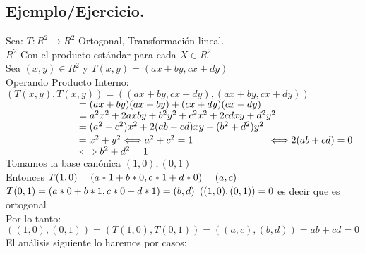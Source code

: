\documentclass{book}
\begin{document}
\subsection{Ejemplo/Ejercicio.}
Sea: $T:R^2\longrightarrow R^2$ Ortogonal, Transformación lineal.
\\$R^2$ Con el producto estándar para cada $X\in R^2$
\\Sea $(x,y)\in R^2$ y $T(x,y)=(ax + by,cx + dy )$
\\Operando Producto Interno:
\\$(T(x,y),T(x,y))=((ax+by,cx+dy),(ax+by,cx+dy))$
$\\\hspace*{2.5cm}=(ax+by)(ax+by)+(cx+dy)(cx+dy)$
$\\\hspace*{2.5cm}=a^2x^2+2axby+b^2y^2+c^2x^2+2cdxy+d^2y^2$
$\\\hspace*{2.5cm}=(a^2+c^2)x^2+2(ab+cd)xy+(b^2+d^2)y^2$
$\\\hspace*{2.5cm}=x^2+y^2\Longleftrightarrow a^2+c^2=1$
$\\\hspace*{2.5cm}\Longleftrightarrow 2(ab+cd)=0$
$\\\hspace*{2.5cm}\Longleftrightarrow b^2+d^2=1$
\\Tomamos la base canónica ${(1,0),(0,1)}$
\\Entonces
$\\T(1,0)=(a*1+b*0,c*1+d*0)=(a,c)$
$\\T(0,1)=(a*0+b*1,c*0+d*1)=(b,d)$
$\\((1,0),(0,1))=0$ es decir que es ortogonal
\\Por lo tanto:
\\$((1,0),(0,1))=(T(1,0),T(0,1))=((a,c),(b,d))=ab+cd=0$
\\El análisis siguiente lo haremos por casos:
\end{document}
